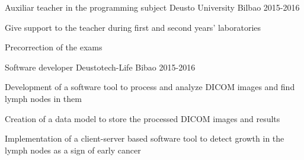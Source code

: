 


\begin{cventries}


\cventry
{Auxiliar teacher in the programming subject} %
{Deusto University} %
{Bilbao} %
{2015-2016} %
{ %
\begin{cvitems}
\item {Give support to the teacher during first and second years' laboratories}
\item {Precorrection of the exams}
\end{cvitems}
}


\cventry
{Software developer} %
{Deustotech-Life} %
{Bibao} %
{2015-2016} %
{ %
\begin{cvitems}
\item {Development of a software tool to process and analyze DICOM images and find lymph nodes in them}
\item {Creation of a data model to store the processed DICOM images and results}
\item {Implementation of a client-server based software tool to detect growth in the lymph nodes as a sign of early cancer}
\end{cvitems}
}
\end{cventries}

